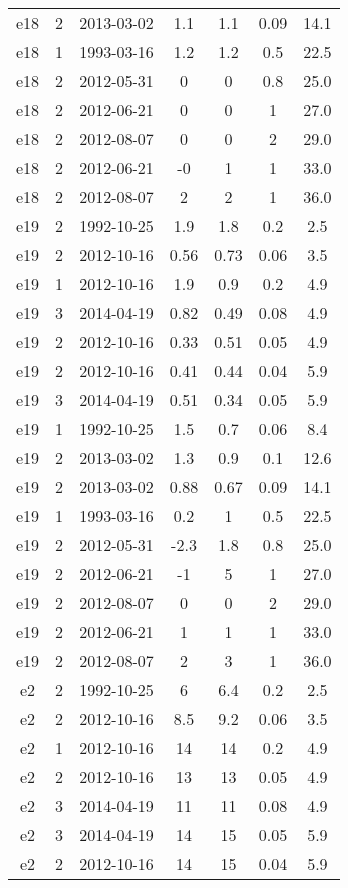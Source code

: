 \begin{table*}[htp]
\begin{tabular}{ccccccc}
e18 & 2 & 2013-03-02 & 1.1 & 1.1 & 0.09 & 14.1 \\
e18 & 1 & 1993-03-16 & 1.2 & 1.2 & 0.5 & 22.5 \\
e18 & 2 & 2012-05-31 & 0 & 0 & 0.8 & 25.0 \\
e18 & 2 & 2012-06-21 & 0 & 0 & 1 & 27.0 \\
e18 & 2 & 2012-08-07 & 0 & 0 & 2 & 29.0 \\
e18 & 2 & 2012-06-21 & -0 & 1 & 1 & 33.0 \\
e18 & 2 & 2012-08-07 & 2 & 2 & 1 & 36.0 \\
e19 & 2 & 1992-10-25 & 1.9 & 1.8 & 0.2 & 2.5 \\
e19 & 2 & 2012-10-16 & 0.56 & 0.73 & 0.06 & 3.5 \\
e19 & 1 & 2012-10-16 & 1.9 & 0.9 & 0.2 & 4.9 \\
e19 & 3 & 2014-04-19 & 0.82 & 0.49 & 0.08 & 4.9 \\
e19 & 2 & 2012-10-16 & 0.33 & 0.51 & 0.05 & 4.9 \\
e19 & 2 & 2012-10-16 & 0.41 & 0.44 & 0.04 & 5.9 \\
e19 & 3 & 2014-04-19 & 0.51 & 0.34 & 0.05 & 5.9 \\
e19 & 1 & 1992-10-25 & 1.5 & 0.7 & 0.06 & 8.4 \\
e19 & 2 & 2013-03-02 & 1.3 & 0.9 & 0.1 & 12.6 \\
e19 & 2 & 2013-03-02 & 0.88 & 0.67 & 0.09 & 14.1 \\
e19 & 1 & 1993-03-16 & 0.2 & 1 & 0.5 & 22.5 \\
e19 & 2 & 2012-05-31 & -2.3 & 1.8 & 0.8 & 25.0 \\
e19 & 2 & 2012-06-21 & -1 & 5 & 1 & 27.0 \\
e19 & 2 & 2012-08-07 & 0 & 0 & 2 & 29.0 \\
e19 & 2 & 2012-06-21 & 1 & 1 & 1 & 33.0 \\
e19 & 2 & 2012-08-07 & 2 & 3 & 1 & 36.0 \\
e2 & 2 & 1992-10-25 & 6 & 6.4 & 0.2 & 2.5 \\
e2 & 2 & 2012-10-16 & 8.5 & 9.2 & 0.06 & 3.5 \\
e2 & 1 & 2012-10-16 & 14 & 14 & 0.2 & 4.9 \\
e2 & 2 & 2012-10-16 & 13 & 13 & 0.05 & 4.9 \\
e2 & 3 & 2014-04-19 & 11 & 11 & 0.08 & 4.9 \\
e2 & 3 & 2014-04-19 & 14 & 15 & 0.05 & 5.9 \\
e2 & 2 & 2012-10-16 & 14 & 15 & 0.04 & 5.9 \\

\end{tabular}
\end{table*}
